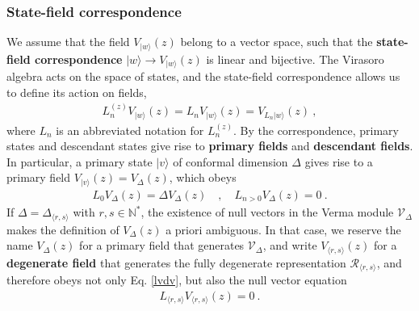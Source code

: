 \documentclass[12pt, a4paper]{article}
\theoremstyle{break}
\begin{document}
\subsubsection{State-field correspondence}

We assume that the field $V_{|w\rangle}(z)$ belong to a vector space, such that the \textbf{state-field correspondence} $|w\rangle \to V_{|w\rangle}(z)$ is linear and bijective. The Virasoro algebra acts on the space of states, and the state-field correspondence allows us to define its action on fields,
\begin{align}
 L_n^{(z)} V_{|w\rangle}(z) = L_n V_{|w\rangle}(z) = V_{L_n|w\rangle}(z)\ ,
\end{align}
where $L_n$ is an abbreviated notation for $L_n^{(z)}$. By the correspondence, primary states and descendant states give rise to \textbf{primary fields} and \textbf{descendant fields}. In particular, a primary state $|v\rangle$ of conformal dimension $\Delta$ gives rise to a primary field $V_{|v\rangle}(z)=V_\Delta(z)$, which obeys 
\begin{align}
 L_0 V_\Delta(z) = \Delta V_\Delta(z) \quad , \quad  L_{n> 0} V_\Delta(z) = 0 \ .
 \label{lvdv}
\end{align}
If $\Delta=\Delta_{\langle r,s\rangle}$ with $r,s\in \mathbb{N}^*$, the existence of null vectors in the Verma module $\mathcal{V}_\Delta$ makes the definition of $V_\Delta(z)$ a priori ambiguous. In that case, we reserve the name $V_\Delta(z)$ for a primary field that generates $\mathcal{V}_\Delta$, and write $V_{\langle r,s\rangle}(z)$ for a \textbf{degenerate field} that generates the fully degenerate representation $\mathcal{R}_{\langle r,s\rangle}$, and therefore obeys not only Eq. \eqref{lvdv}, but also the null vector equation
\begin{align}
L_{\langle r, s\rangle} V_{\langle r,s\rangle}(z) = 0\ .
\end{align}
\end{document}
